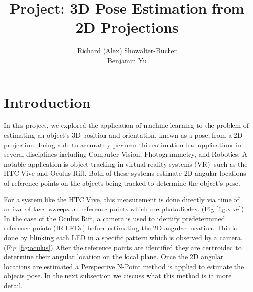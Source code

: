 \documentclass[journal]{IEEEtran}
\begin{document}
%
\title{Project: 3D Pose Estimation from 2D Projections}
%
%
%

\author{Richard (Alex) Showalter-Bucher\\Benjamin Yu}


\maketitle

\section{Introduction}
In this project, we explored the application of machine learning to the problem of estimating an object's 3D position and orientation, known as a pose, from a 2D projection. Being able to accurately perform this estimation has applications in several disciplines including Computer Vision, Photogrammetry, and Robotics\cite{Robust_PNP}. A notable application is object tracking in virtual reality systems (VR), such as the HTC Vive and Oculus Rift. Both of these systems estimate 2D angular locations of reference points on the objects being tracked to determine the object's pose.

For a system like the HTC Vive, this measurement is done directly via time of arrival of laser sweeps on reference points which are photodiodes. (Fig \ref{fig:vive}) In the case of the Oculus Rift, a camera is used to identify predetermined reference points (IR LEDs) before estimating the 2D angular location. This is done by blinking each LED in a specific pattern which is observed by a camera. (Fig \ref{fig:oculus}) After the reference points are identified they are centroided to determine their angular location on the focal plane. Once the 2D angular locations are estimated a Perspective N-Point method is applied to estimate the objects pose. In the next subsection we discuss what this method is in more detail. 
\end{document}
